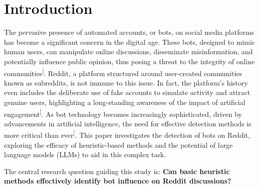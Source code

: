 \documentclass[
  12pt,
  letterpaper,
  DIV=11,
  numbers=noendperiod,
  abstract]{scrartcl}
\begin{document}
\newpage

\tableofcontents

\newpage

\section{Introduction}\label{introduction}

The pervasive presence of automated accounts, or bots, on social media
platforms has become a significant concern in the digital age. These
bots, designed to mimic human users, can manipulate online discussions,
disseminate misinformation, and potentially influence public opinion,
thus posing a threat to the integrity of online
communities\textsuperscript{{[}\citeproc{ref-botdetectionreddit}{1}{]}}.
Reddit, a platform structured around user-created communities known as
subreddits, is not immune to this issue. In fact, the platform's history
even includes the deliberate use of fake accounts to simulate activity
and attract genuine users, highlighting a long-standing awareness of the
impact of artificial
engagement\textsuperscript{{[}\citeproc{ref-redditbotproblem}{2}{]}}. As
bot technology becomes increasingly sophisticated, driven by
advancements in artificial intelligence, the need for effective
detection methods is more critical than
ever\textsuperscript{{[}\citeproc{ref-botdetectionreddit}{1}{]}}. This
paper investigates the detection of bots on Reddit, exploring the
efficacy of heuristic-based methods and the potential of large language
models (LLMs) to aid in this complex task.

The central research question guiding this study is: \textbf{Can basic
heuristic methods effectively identify bot influence on Reddit
discussions?}
\end{document}
